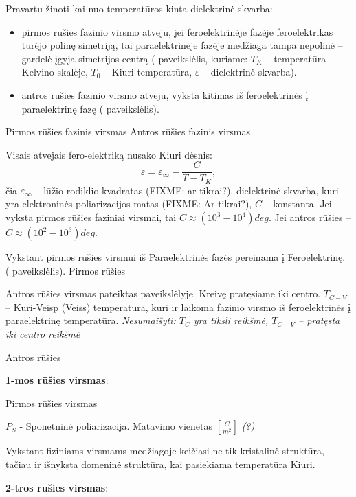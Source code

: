 Pravartu žinoti kai nuo temperatūros kinta dielektrinė skvarba:
\begin{itemize}
  \item pirmos rūšies fazinio virsmo atveju, jei feroelektrinėje
    fazėje feroelektrikas turėjo polinę simetriją, tai
    paraelektrinėje fazėje medžiaga tampa nepolinė – gardelė
    įgyja simetrijos centrą ( paveikslėlis, kuriame:
    $T_{K}$ – temperatūra Kelvino skalėje, $T_{0}$ – Kiuri
    temperatūra, $\varepsilon$ – dielektrinė skvarba).
  \item antros rūšies fazinio virsmo atveju, vyksta kitimas iš
    feroelektrinės į paraelektrinę fazę ( paveikslėlis).
\end{itemize}

{Pirmos rūšies fazinis virsmas}
{Antros rūšies fazinis virsmas}

Visais atvejais fero-elektriką nusako Kiuri dėsnis:
\begin{equation*}
  \varepsilon = \varepsilon_{\infty} - \frac{C}{T - T_K},
\end{equation*}
čia $\varepsilon_{\infty}$ – lūžio rodiklio kvadratas (FIXME: ar tikrai?),
dielektrinė skvarba, kuri yra elektroninės poliarizacijos matas
(FIXME: Ar tikrai?), $C$ – konstanta. Jei vyksta pirmos rūšies
faziniai virsmai, tai $C \approx (10^3 - 10^4) deg$. Jei antros rūšies
– $C \approx (10^2 - 10^3) deg$.

Vykstant pirmos rūšies virsmui iš Paraelektrinės fazės pereinama į
Feroelektrinę. ( paveikslėlis).
{Pirmos rūšies}

Antros rūšies virsmas pateiktas  paveikslėlyje.
Kreivę pratęsiame iki centro. $T_{C-V}$ – Kuri-Veisp (Veiss)
temperatūra, kuri ir laikoma fazinio virsmo iš feroelektrinės į
paraelektrinę temperatūra.
\textit{Nesumaišyti: $T_C$ yra tiksli reikšmė, $T_{C-V}$ – pratęsta
iki centro reikšmė}

{Antros rūšies}


\textbf{1-mos rūšies virsmas}:

{Pirmos rūšies virsmas}

$P_S$ - Sponetninė poliarizacija. Matavimo vienetas $[\frac{C}{m^2}]$ \textit{(?)}

Vykstant fiziniams virsmams medžiagoje keičiasi ne tik kristalinė struktūra,
tačiau ir išnyksta domeninė struktūra, kai pasiekiama temperatūra Kiuri.

\textbf{2-tros rūšies virsmas}:

